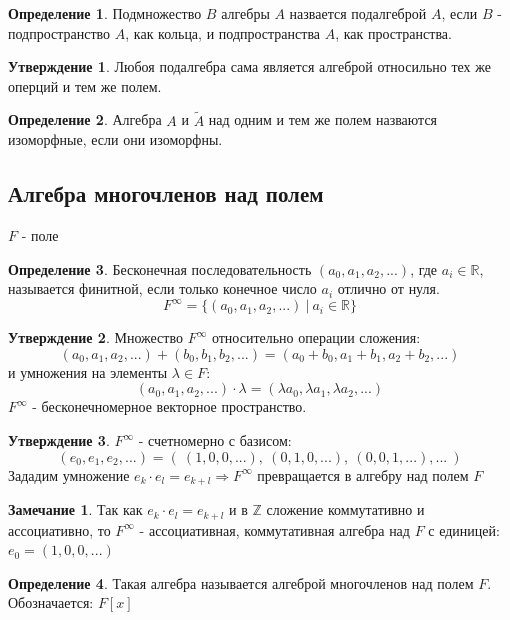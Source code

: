\documentclass[a4paper, 12pt]{article}
\newcommand{\R}{\mathbb R}
\newcommand{\Z}{\mathbb Z}
\theoremstyle{definition}
\newtheorem*{definition}{Определение}
\newtheorem*{subtheorem}{Утверждение}
\newtheorem*{remark}{Замечание}
\begin{document}
  \begin{definition}
    Подмножество $B$ алгебры $A$ назвается подалгеброй $A$, если $B$ - подпространство $A$, как кольца, и подпространства $A$, как пространства.      
  \end{definition} 
  \begin{subtheorem}
    Любоя подалгебра сама является алгеброй относильно тех же оперций и тем же полем.
  \end{subtheorem} 
  \begin{definition}
    Алгебра $A$ и $\widetilde{A}$ над одним и тем же полем назваются изоморфные, если они изоморфны.
  \end{definition}

  \subsection{Алгебра многочленов над полем}
  $F$ - поле
  \begin{definition}
    Бесконечная последовательность $(a_0,a_1, a_2,...)$, где $a_i \in \R$, называется финитной, если только конечное число $a_i$ отлично от нуля. 
    $$F^{\infty} = \{(a_0,a_1, a_2,...) \ |\ a_i \in \R\}$$ 
  \end{definition}  
  \begin{subtheorem}
    Множество $F^{\infty}$ относительно операции сложения: $$(a_0,a_1, a_2,...) + (b_0,b_1, b_2,...) = (a_0+b_0,a_1+b_1, a_2+b_2,...)$$ и умножения на элементы $\lambda \in F$: $$(a_0,a_1, a_2,...) \cdot \lambda = (\lambda a_0,\lambda a_1, \lambda a_2,...)$$
    $F^{\infty}$ - бесконечномерное векторное пространство.   
  \end{subtheorem} 
  \begin{subtheorem}
    $F^{\infty}$ - счетномерно с базисом:
    $$(e_0,e_1,e_2,...) = ( \ (1, 0, 0, ...), \ (0, 1, 0, ...), \ (0, 0, 1, ...), ... \ )$$ 
    Зададим умножение $e_k \cdot e_l = e_{k+l} \Longrightarrow F^{\infty}$  превращается в алгебру над полем $F$ 
  \end{subtheorem} 
  \begin{remark}
    Так как $e_k \cdot e_l = e_{k+l}$ и в $\Z$ сложение коммутативно и ассоциативно, то $F^{\infty}$ - ассоциативная, коммутативная алгебра над $F$ с единицей: $e_0 = (1, 0, 0, ...)$
  \end{remark} 
  \begin{definition}
    Такая алгебра называется алгеброй многочленов над полем $F$. 
    Обозначается: $F[x]$  
  \end{definition} 
\end{document}

